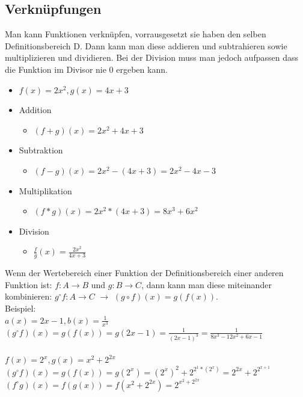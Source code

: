 \documentclass{article}
\begin{document}
	 \subsection{Verknüpfungen}
	 Man kann Funktionen verknüpfen, vorrausgesetzt sie haben den selben Definitionsbereich D. Dann kann man diese addieren und subtrahieren sowie multiplizieren und dividieren. Bei der Division muss man jedoch aufpassen dass die Funktion im Divisor nie 0 ergeben kann.
	 \begin{itemize}
	 	\item{$f(x) = 2x^2, g(x)=4x+3$}
	 	\item{Addition}
	 	\begin{itemize}
	 		\item{$(f+g)(x)=2x^2+4x+3$}
	 	\end{itemize}
	 	\item{Subtraktion}
	 	\begin{itemize}
	 		\item{$(f-g)(x)=2x^2-(4x+3)=2x^2-4x-3$}
	 	\end{itemize}
	 	\item{Multiplikation}
	 	\begin{itemize}
	 		\item{$(f*g)(x)=2x^2*(4x+3)=8x^3+6x^2$}
	 	\end{itemize}
	 	\item{Division}
	 	\begin{itemize}
	 		\item{$\frac{f}{g}(x)=\frac{2x^2}{4x+3}$}
	 	\end{itemize}
	 \end{itemize}
	 Wenn der Wertebereich einer Funktion der Definitionsbereich einer anderen Funktion ist: $f:A \rightarrow B$ und $ g:B\rightarrow C$, dann kann man diese miteinander kombinieren: $g^\circ f:A\rightarrow C$ $\to$ $(g\circ f)(x) = g(f(x))$. \\
	 Beispiel: \\
	 $a(x)=2x-1, b(x)=\frac{1}{x^3}$ \\
	 $(g^\circ f)(x)=g(f(x))=g(2x-1)=\frac{1}{(2x-1)^3}=\frac{1}{8x^3-12x^2+6x-1}$ \\ \\
	 $f(x)=2^x, g(x)=x^2+2^{2x}$ \\
	 $(g^\circ f)(x)=g(f(x))=g(2^x)=(2^x)^2+2^{2^1*(2^x)}=2^{2x}+2^{2^{x+1}}$ \\
	 $(f^\circ g)(x)=f(g(x))=f(x^2+2^{2x})=2^{x^2+2^{2x}}$ \\
\end{document}
